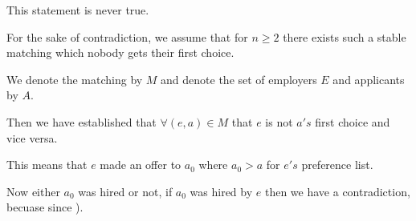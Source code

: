 \documentclass[11pt,fleqn]{exam}
\newenvironment{soln}{\color{solnblue}}{}
\newif\ifsolutions\solutionsfalse
\begin{document}

\ifsolutions\else\newpage\fi



\begin{soln}
	This statement is never true.

	For the sake of contradiction, we assume that for \(n \geq 2\) there exists such a stable matching which nobody gets their first choice.

	We denote the matching by \(M\) and denote the set of employers \(E\) and applicants by \(A\).

	Then we have established that \(\forall (e, a) \in M\) that \(e\) is not \(a's\) first choice and vice versa.

	This means that \(e\) made an offer to \(a_0\) where \(a_0 > a\) for \(e's\) preference list.

	Now either \(a_0\) was hired or not, if \(a_0\) was hired by \(e\) then we have a contradiction, becuase since ).
\end{soln}


\ifsolutions\else\newpage\fi


\ifsolutions\else\newpage\fi
\end{document}
